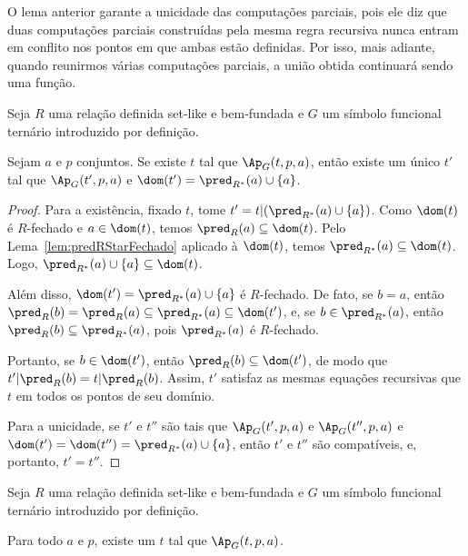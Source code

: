 O lema anterior garante a unicidade das computações parciais, pois ele diz que duas computações parciais construídas pela mesma regra recursiva nunca entram em conflito nos pontos em que ambas estão definidas.
Por isso, mais adiante, quando reunirmos várias computações parciais, a união obtida continuará sendo uma função.

\begin{corollary}[$\ZFmP$]
    Seja $R$ uma relação definida set-like e bem-fundada e $G$ um símbolo funcional ternário introduzido por definição.

    Sejam $a$ e $p$ conjuntos.
    Se existe $t$ tal que $\Ap_G(t, p, a)$, então existe um único $t'$ tal que $\Ap_G(t', p, a)$ e $\dom(t')=\pred_{R^*}(a)\cup\{a\}$.
\end{corollary}
\begin{proof}
    Para a existência, fixado $t$, tome $t'=t|(\pred_{R^*}(a)\cup\{a\})$.
    Como $\dom(t)$ é $R$-fechado e $a\in \dom(t)$, temos $\pred_R(a)\subseteq \dom(t)$.
    Pelo Lema~\ref{lem:predRStarFechado} aplicado à $\dom(t)$, temos $\pred_{R^*}(a)\subseteq \dom(t)$.
    Logo, $\pred_{R^*}(a)\cup\{a\}\subseteq \dom(t)$.

    Além disso, $\dom(t')=\pred_{R^*}(a)\cup\{a\}$ é $R$-fechado.
    De fato, se $b=a$, então $\pred_R(b)=\pred_R(a)\subseteq \pred_{R^*}(a)\subseteq \dom(t')$, e, se $b\in \pred_{R^*}(a)$, então $\pred_R(b)\subseteq \pred_{R^*}(a)$, pois $\pred_{R^*}(a)$ é $R$-fechado.

    Portanto, se $b\in \dom(t')$, então $\pred_R(b)\subseteq \dom(t')$, de modo que $t'|\pred_R(b)=t|\pred_R(b)$.
    Assim, $t'$ satisfaz as mesmas equações recursivas que $t$ em todos os pontos de seu domínio.

    Para a unicidade, se $t'$ e $t''$ são tais que $\Ap_G(t', p, a)$ e $\Ap_G(t'', p, a)$ e $\dom(t')=\dom(t'')=\pred_{R^*}(a)\cup\{a\}$, então $t'$ e $t''$ são compatíveis, e, portanto, $t'=t''$.
\end{proof}
\begin{lemma}[$\ZFmP$]
    Seja $R$ uma relação definida set-like e bem-fundada e $G$ um símbolo funcional ternário introduzido por definição.

    Para todo $a$ e $p$, existe um $t$ tal que $\Ap_G(t, p, a)$.
\end{lemma}


